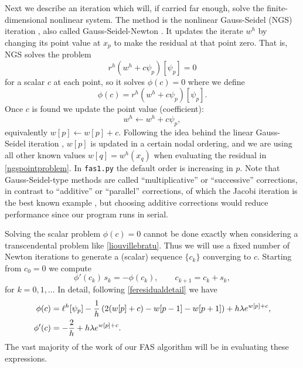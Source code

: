 \documentclass[letterpaper,final,12pt,reqno]{amsart}
\begin{document}
Next we describe an iteration which will, if carried far enough, solve the finite-dimensional nonlinear system.  The method is the nonlinear Gauss-Seidel (NGS) iteration \cite{Briggsetal2000}, also called Gauss-Seidel-Newton \cite{BrandtLivne2011}.  It updates the iterate $w^h$ by changing its point value at $x_p$ to make the residual at that point zero.  That is, NGS solves the problem
\begin{equation}
r^h(w^h + c \psi_p)[\psi_p] = 0  \label{ngspointproblem}
\end{equation}
for a scalar $c$ at each point, so it solves $\phi(c)=0$ where we define
\begin{equation}
  \phi(c) = r^h(w^h + c \psi_p)[\psi_p]. \label{ngspointresidual}
\end{equation}
Once $c$ is found we update the point value (coefficient):
\begin{equation}
  w^h \leftarrow w^h + c \psi_p,  \label{ngspointupdate}
\end{equation}
equivalently $w[p] \leftarrow w[p] + c$.  Following the idea behind the linear Gauss-Seidel iteration \cite{Greenbaum1997}, $w[p]$ is updated in a certain nodal ordering, and we are using all other known values $w[q]=w^h(x_q)$ when evaluating the residual in \eqref{ngspointproblem}.  In \texttt{fas1.py} the default order is increasing in $p$.  Note that Gauss-Seidel-type methods are called ``multiplicative'' or ``successive'' \cite{GraeserKornhuber2009} corrections, in contrast to ``additive'' or ``parallel'' corrections, of which the Jacobi iteration is the best known example \cite{Greenbaum1997}, but choosing additive corrections would reduce performance since our program runs in serial.

Solving the scalar problem $\phi(c)=0$ cannot be done exactly when considering a transcendental problem like \eqref{liouvillebratu}.  Thus we will use a fixed number of Newton iterations \cite[Chapter 4]{Bueler2021} to generate a (scalar) sequence $\{c_k\}$ converging to $c$.  Starting from $c_0=0$ we compute
\begin{equation}
\phi'(c_k)\, s_k = -\phi(c_k),  \qquad  c_{k+1} = c_k + s_k, \label{ngsnewton}
\end{equation}
for $k=0,1,\dots$  In detail, following \eqref{feresidualdetail} we have
\begin{align}
   \phi(c) &= \ell^h[\psi_p] - \frac{1}{h} \left(2(w[p]+c) - w[p-1] - w[p+1]\right) + h \lambda e^{w[p]+c}, \label{ngsnewtondetails} \\
   \phi'(c) &= -\frac{2}{h} + h \lambda e^{w[p]+c}. \notag
\end{align}
The vast majority of the work of our FAS algorithm will be in evaluating these expressions.
\end{document}
